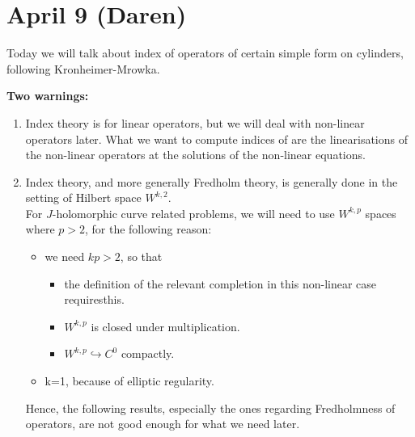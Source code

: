 \section*{\textbf{April 9 (Daren)}}

	Today we will talk about index of operators of certain simple form on cylinders, following Kronheimer-Mrowka.
\newline
		
		
		\textbf{Two warnings:}\\
		\begin{enumerate}
			\item Index theory is for linear operators, but we will deal with non-linear operators later. What we want to compute indices of are the linearisations of the non-linear operators at the solutions of the non-linear equations.
			\item Index theory, and more generally Fredholm theory, is generally done in the setting of Hilbert space $W^{k,2}$. \\
			For $J$-holomorphic curve related problems, we will need to use $W^{k,p}$ spaces where $p>2$, for the following reason:
			 \begin{itemize}
			 	\item we need $kp >2$, so that
			 	 \begin{itemize}
			 	 	\item the definition of the relevant completion in this non-linear case requiresthis.
			 	 	\item $W^{k,p}$ is closed under multiplication.
			 	 	\item $W^{k,p}\hookrightarrow C^0$ compactly.
			 	 \end{itemize}
			 	\item k=1, because of elliptic regularity.
			 \end{itemize}
			 Hence, the following results, especially the ones regarding Fredholmness of operators, are not good enough for what we need later.
		\end{enumerate}
		
